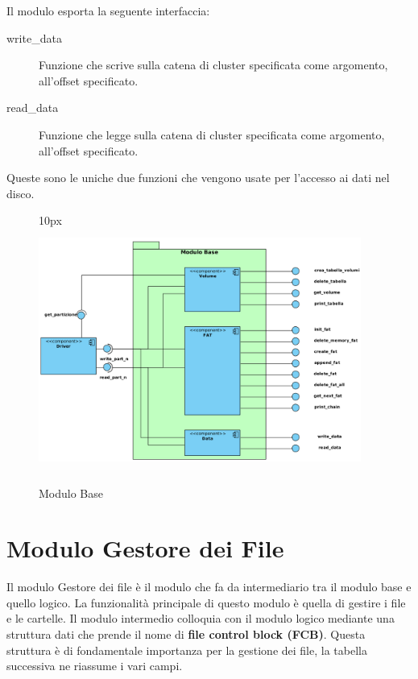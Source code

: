   Il modulo esporta la seguente interfaccia: 
    \begin{description}
     \item[write\_data] Funzione che scrive  sulla catena di cluster specificata come argomento, all'offset specificato.
     \end{description}
    \begin{description}
     \item[read\_data]  Funzione che legge sulla catena di cluster specificata come argomento, all'offset specificato.
    \end{description}
  Queste sono le uniche due funzioni che vengono usate per l'accesso ai dati nel disco. 

  \begin{figure}[!h]
 \centering
  \textheight 10px
 \includegraphics[width=400px,height=300px]{./Immagini/Base.png}
 \caption{Modulo Base}
 \label{fig:Base}
\end{figure}

\newpage 

\section{Modulo Gestore dei File}
 Il modulo Gestore dei file è il modulo che fa da intermediario tra il modulo base e quello logico.
  La funzionalità principale di questo modulo è quella di gestire i file e le cartelle. 
 Il modulo intermedio colloquia con il modulo logico mediante una struttura dati che prende il nome di \textbf{file control block (FCB)}. 
 Questa struttura è di fondamentale importanza per la gestione dei file, la tabella successiva ne riassume i vari campi.
  
